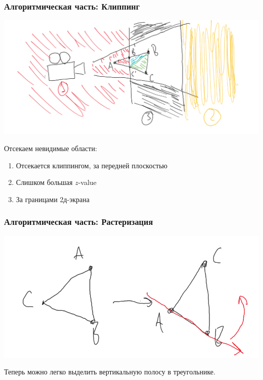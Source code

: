 \documentclass{beamer}
\begin{document}
\begin{frame}
\frametitle{Алгоритмическая часть: Клиппинг}

\begin{center}
\includegraphics[width=\linewidth]{clipping.png}
\end{center}
Отсекаем невидимые области:
\begin{enumerate}
	\item Отсекается клиппингом, за передней плоскостью
	\item Слишком большая $z$-value
	\item За границами 2д-экрана
\end{enumerate}
\end{frame}

\begin{frame}
\frametitle{Алгоритмическая часть: Растеризация}

\begin{center}
\includegraphics[width=\linewidth]{sort_triangle_1.png}
\end{center}

Теперь можно легко выделить вертикальную полосу в треугольнике.
\end{frame}
\end{document}
